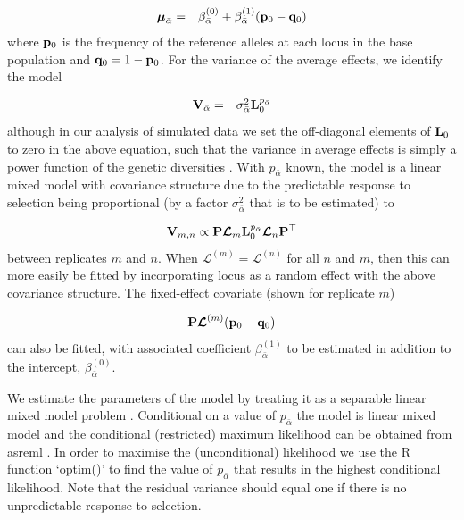 \documentclass[12pt]{article}
\begin{document}
\begin{bibunit}
\begin{equation} 
\begin{array}{rl}
\boldsymbol{\mu}_{\bar{\alpha}} = & \beta^{(0)}_{\bar{\alpha}}+\beta^{(1)}_{\bar{\alpha}}({\bf p}_{0}-{\bf q}_{0})
\end{array}
\end{equation}
where ${\bf p}_{0}$ is the frequency of the reference alleles at each locus in the base population and ${\bf q}_{0}=1-{\bf p}_{0}$. For the variance of the average effects, we identify the model 

\begin{equation} 
\begin{array}{rl}
{\bf V}_{\bar{\alpha}}=& \sigma^2_{\bar{\alpha}}{\bf L}_{0}^{p_{\bar{\alpha}}}
\end{array}
\end{equation}
although in our analysis of simulated data we set the off-diagonal elements of ${\bf L}_{0}$ to zero in the above equation, such that the variance in average effects is simply a power function of the genetic diversities \citep{zeng2018signatures}. With $p_{\bar{\alpha}}$ known, the model is a linear mixed model with covariance structure due to the predictable response to selection being proportional (by a factor $\sigma^2_{\bar{\alpha}}$ that is to be estimated) to

\begin{equation} 
{\bf V}_{m,n} \propto {\bf P}\boldsymbol{\mathcal{L}}_m{\bf L}_{0}^{p_{\bar{\alpha}}}
\boldsymbol{\mathcal{L}}_n{\bf P}^{\top}
\end{equation}
between replicates $m$ and $n$. When $\boldsymbol{\mathcal{L}}^{(m)}=\boldsymbol{\mathcal{L}}^{(n)}$ for all $n$ and $m$, then this can more easily be fitted by incorporating locus as a random effect with the above covariance structure. The fixed-effect covariate (shown for replicate $m$)

\begin{equation} 
{\bf P}\boldsymbol{\mathcal{L}}^{(m)}({\bf p}_{0}-{\bf q}_{0})
\end{equation}
can also be fitted, with associated coefficient $\beta^{(1)}_{\bar{\alpha}}$ to be estimated in addition to the intercept, $\beta^{(0)}_{\bar{\alpha}}$. 

We estimate the parameters of the model by treating it as a separable linear mixed model problem
\citep{richards1961method}. Conditional on a value of ${p_{\bar{\alpha}}}$ the model is linear mixed model and the conditional (restricted) maximum likelihood can be obtained from asreml \citep{Butler.2023}. In order to maximise the (unconditional) likelihood we use the R function `optim()' to find the value of  ${p_{\bar{\alpha}}}$ that results in the highest conditional likelihood. Note that the residual variance should equal one if there is no unpredictable response to selection. 


\end{bibunit}
\end{document}
